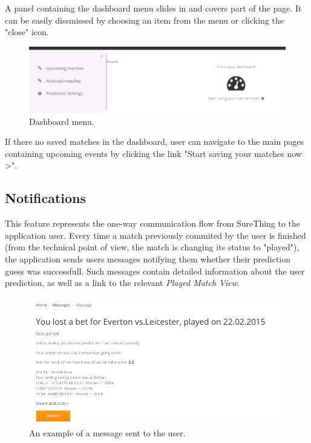 A panel containing the dashboard menu slides in and covers part of the page. It can be easily dissmissed by choosing an item from the menu or clicking the "close" icon.

\begin{figure}[H]
	\begin{center}
		\includegraphics[width=.90\textwidth]{impl/images/dashboardMenu}
		\caption{Dashboard menu.} \label{fig:using: dashboardmenu}
	\end{center}
\end{figure}

If there no saved matches in the dashboard, user can navigate to the main pages containing upcoming events by clicking the link "Start saving your matches now >".

\subsection{Notifications}
\label{subsec:notifications}
This feature represents the one-way communication flow from SureThing to the application user. Every time a match previously commited by the user is finished (from the technical point of view, the match is changing its status to "played"), the application sends users messages notifying them whether their prediction guess was successfull. Such messages contain detailed information about the user prediction, as well as a link to the relevant \emph{Played Match View}.

\begin{figure}[H]
	\begin{center}
		\includegraphics[width=.90\textwidth]{impl/images/message}
		\caption{An example of a message sent to the user.} \label{fig:using: message}
	\end{center}
\end{figure}

